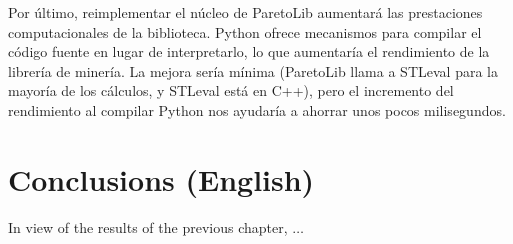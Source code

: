 Por último, reimplementar el núcleo de ParetoLib aumentará las prestaciones computacionales de la biblioteca. Python ofrece mecanismos para compilar el código fuente en lugar de interpretarlo, lo que aumentaría el rendimiento de la librería de minería. La mejora sería mínima (ParetoLib llama a STLeval para la mayoría de los cálculos, y STLeval está en C++), pero el incremento del rendimiento al compilar Python nos ayudaría a ahorrar unos pocos milisegundos.

\section{Conclusions (English)}
In view of the results of the previous chapter, $\ldots$


